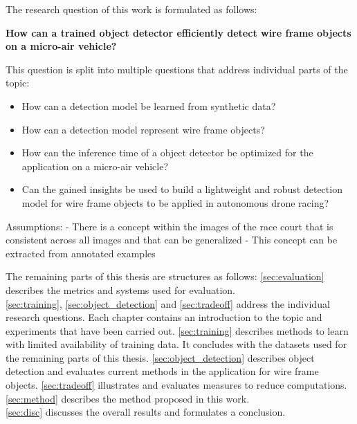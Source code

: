 The research question of this work is formulated as follows:
\begin{center}
	\textbf{How can a trained object detector efficiently detect wire frame objects on a micro-air vehicle?}
\end{center}


This question is split into multiple questions that address individual parts of the topic:

\begin{itemize}
	\item How can a detection model be learned from synthetic data?
	\item How can a detection model represent wire frame objects?
	\item How can the inference time of a object detector be optimized for the application on a micro-air vehicle?
	\item Can the gained insights be used to build a lightweight and robust detection model for wire frame objects to be applied in autonomous drone racing?
\end{itemize}

Assumptions:
- There is a concept within the images of the race court that is consistent across all images and that can be generalized
- This concept can be extracted from annotated examples

The remaining parts of this thesis are structures as follows: \autoref{sec:evaluation} describes the metrics and systems used for evaluation.\\
 \autoref{sec:training}, \autoref{sec:object_detection} and \autoref{sec:tradeoff} address the individual research questions. Each chapter contains an introduction to the topic and experiments that have been carried out. \autoref{sec:training} describes methods to learn with limited availability of training data. It concludes with the datasets used for the remaining parts of this thesis.  \autoref{sec:object_detection} describes object detection and evaluates current methods in the application for wire frame objects.
\autoref{sec:tradeoff} illustrates and evaluates measures to reduce computations.
\autoref{sec:method} describes the method proposed in this work.\\
\autoref{sec:disc} discusses the overall results and formulates a conclusion.
